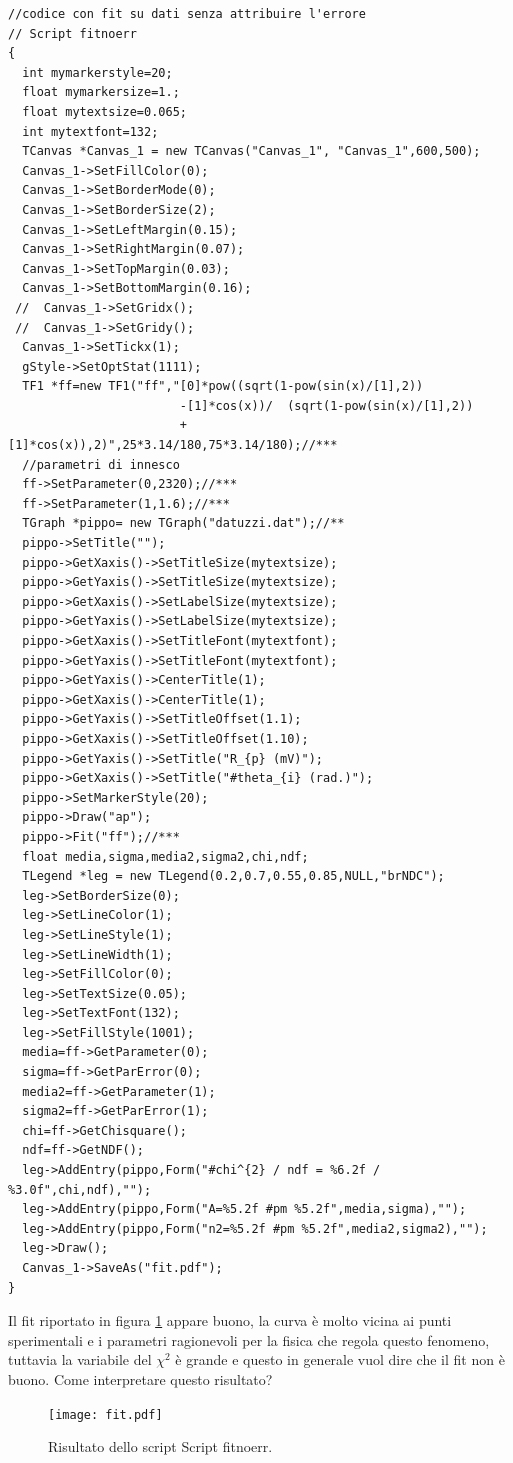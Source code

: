 \documentclass[11pt,fleqn]{book} %
\begin{document}
\begin{verbatim}
//codice con fit su dati senza attribuire l'errore
// Script fitnoerr
{
  int mymarkerstyle=20;
  float mymarkersize=1.;
  float mytextsize=0.065;
  int mytextfont=132;
  TCanvas *Canvas_1 = new TCanvas("Canvas_1", "Canvas_1",600,500);
  Canvas_1->SetFillColor(0);
  Canvas_1->SetBorderMode(0);
  Canvas_1->SetBorderSize(2);
  Canvas_1->SetLeftMargin(0.15);
  Canvas_1->SetRightMargin(0.07);
  Canvas_1->SetTopMargin(0.03);
  Canvas_1->SetBottomMargin(0.16);
 //  Canvas_1->SetGridx();
 //  Canvas_1->SetGridy();
  Canvas_1->SetTickx(1);
  gStyle->SetOptStat(1111);
  TF1 *ff=new TF1("ff","[0]*pow((sqrt(1-pow(sin(x)/[1],2))
                        -[1]*cos(x))/  (sqrt(1-pow(sin(x)/[1],2))
                        +[1]*cos(x)),2)",25*3.14/180,75*3.14/180);//***
  //parametri di innesco
  ff->SetParameter(0,2320);//***
  ff->SetParameter(1,1.6);//***
  TGraph *pippo= new TGraph("datuzzi.dat");//**
  pippo->SetTitle("");
  pippo->GetXaxis()->SetTitleSize(mytextsize);
  pippo->GetYaxis()->SetTitleSize(mytextsize);
  pippo->GetXaxis()->SetLabelSize(mytextsize);
  pippo->GetYaxis()->SetLabelSize(mytextsize);
  pippo->GetXaxis()->SetTitleFont(mytextfont);
  pippo->GetYaxis()->SetTitleFont(mytextfont);
  pippo->GetYaxis()->CenterTitle(1);
  pippo->GetXaxis()->CenterTitle(1);
  pippo->GetYaxis()->SetTitleOffset(1.1);
  pippo->GetXaxis()->SetTitleOffset(1.10);
  pippo->GetYaxis()->SetTitle("R_{p} (mV)");
  pippo->GetXaxis()->SetTitle("#theta_{i} (rad.)");
  pippo->SetMarkerStyle(20);
  pippo->Draw("ap");
  pippo->Fit("ff");//***
  float media,sigma,media2,sigma2,chi,ndf;
  TLegend *leg = new TLegend(0.2,0.7,0.55,0.85,NULL,"brNDC");
  leg->SetBorderSize(0);
  leg->SetLineColor(1);
  leg->SetLineStyle(1);
  leg->SetLineWidth(1);
  leg->SetFillColor(0);
  leg->SetTextSize(0.05);
  leg->SetTextFont(132);
  leg->SetFillStyle(1001);
  media=ff->GetParameter(0);
  sigma=ff->GetParError(0);
  media2=ff->GetParameter(1);
  sigma2=ff->GetParError(1);
  chi=ff->GetChisquare();
  ndf=ff->GetNDF();
  leg->AddEntry(pippo,Form("#chi^{2} / ndf = %6.2f / %3.0f",chi,ndf),"");
  leg->AddEntry(pippo,Form("A=%5.2f #pm %5.2f",media,sigma),"");
  leg->AddEntry(pippo,Form("n2=%5.2f #pm %5.2f",media2,sigma2),"");
  leg->Draw();
  Canvas_1->SaveAs("fit.pdf");
}
\end{verbatim}

Il fit riportato in figura \ref{fitnoerr} appare buono, la curva è molto vicina ai punti sperimentali e i parametri ragionevoli per la fisica che regola questo fenomeno, tuttavia la variabile del $\chi^2$ è grande e questo in generale vuol dire che il fit non è buono. Come interpretare questo risultato?
\begin{figure}[h]
\centering
\texttt{[image: fit.pdf]}
\caption{Risultato dello script Script fitnoerr. \label{fitnoerr}}
\end{figure}
\end{document}
